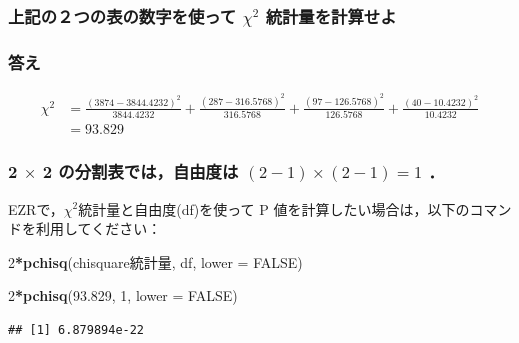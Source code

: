 \documentclass[]{problemset}
\newenvironment{Shaded}{\begin{snugshade}}{\end{snugshade}}
\newcommand{\DataTypeTok}[1]{\textcolor[rgb]{0.13,0.29,0.53}{#1}}
\newcommand{\DecValTok}[1]{\textcolor[rgb]{0.00,0.00,0.81}{#1}}
\newcommand{\FloatTok}[1]{\textcolor[rgb]{0.00,0.00,0.81}{#1}}
\newcommand{\KeywordTok}[1]{\textcolor[rgb]{0.13,0.29,0.53}{\textbf{#1}}}
\newcommand{\NormalTok}[1]{#1}
\newcommand{\OperatorTok}[1]{\textcolor[rgb]{0.81,0.36,0.00}{\textbf{#1}}}
\newcommand{\OtherTok}[1]{\textcolor[rgb]{0.56,0.35,0.01}{#1}}
\begin{document}
\hypertarget{-chi2-}{%
\subsubsection{\texorpdfstring{上記の２つの表の数字を使って \(\chi^2\)
統計量を計算せよ}{上記の２つの表の数字を使って \textbackslash{}chi\^{}2 統計量を計算せよ}}\label{-chi2-}}

\hypertarget{-6}{%
\subsubsection{答え}\label{-6}}

\[
\begin{aligned}
\chi^2 & = \frac{(3874 - 3844.4232)^2}{3844.4232} + \frac{(287 - 316.5768)^2}{316.5768} + \frac{(97 - 126.5768)^2}{126.5768} + \frac{(40 - 10.4232)^2}{10.4232} \\
       & = 93.829
\end{aligned}
\]

\hypertarget{times-2--2-1times2-1-1}{%
\subsubsection{\texorpdfstring{2 \(\times\) 2 の分割表では，自由度は
\((2-1)\times(2-1) = 1\)
．}{2 \textbackslash{}times 2 の分割表では，自由度は (2-1)\textbackslash{}times(2-1) = 1 ．}}\label{times-2--2-1times2-1-1}}

EZRで，\(\chi^2\)統計量と自由度(df)を使って P
値を計算したい場合は，以下のコマンドを利用してください：

\begin{Shaded}
\begin{Highlighting}[]
\DecValTok{2}\OperatorTok{*}\KeywordTok{pchisq}\NormalTok{(chisquare統計量, df, }\DataTypeTok{lower =} \OtherTok{FALSE}\NormalTok{)}
\end{Highlighting}
\end{Shaded}

\begin{Shaded}
\begin{Highlighting}[]
\DecValTok{2}\OperatorTok{*}\KeywordTok{pchisq}\NormalTok{(}\FloatTok{93.829}\NormalTok{, }\DecValTok{1}\NormalTok{, }\DataTypeTok{lower =} \OtherTok{FALSE}\NormalTok{)}
\end{Highlighting}
\end{Shaded}

\begin{verbatim}
## [1] 6.879894e-22
\end{verbatim}
\end{document}
